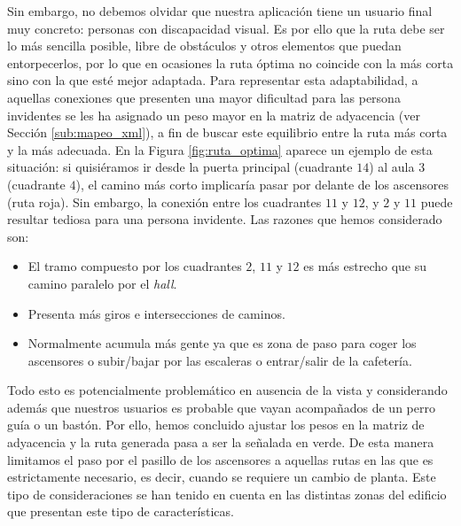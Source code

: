 Sin embargo, no debemos olvidar que nuestra aplicación tiene un usuario final muy concreto: personas con discapacidad visual. Es por ello que la ruta debe ser lo más sencilla posible, libre de obstáculos y otros elementos que puedan entorpecerlos, por lo que en ocasiones la ruta óptima no coincide con la más corta sino con la que esté mejor adaptada. Para representar esta adaptabilidad, a aquellas conexiones que presenten una mayor dificultad para las persona invidentes se les ha asignado un peso mayor en la matriz de adyacencia (ver Sección \ref{sub:mapeo_xml}), a fin de buscar este equilibrio entre la ruta más corta y la más adecuada. En la Figura \ref{fig:ruta_optima} aparece un ejemplo de esta situación: si quisiéramos ir desde la puerta principal (cuadrante $14$) al aula 3 (cuadrante $4$), el camino más corto implicaría pasar por delante de los ascensores (ruta roja). Sin embargo, la conexión entre los cuadrantes $11$ y $12$, y $2$ y $11$ puede resultar tediosa para una persona invidente. Las razones que hemos considerado son: 
\begin{itemize}
	\item El tramo compuesto por los cuadrantes $2$, $11$ y $12$ es más estrecho que su camino paralelo por el \textit{hall}.
	\item Presenta más giros e intersecciones de caminos.
	\item Normalmente acumula más gente ya que es zona de paso para coger los ascensores o subir/bajar por las escaleras o entrar/salir de la cafetería.
\end{itemize} 
 	Todo esto es potencialmente problemático en ausencia de la vista y considerando además que nuestros usuarios es probable que vayan acompañados de un perro guía o un bastón. Por ello, hemos concluido ajustar los pesos en la matriz de adyacencia y la ruta generada pasa a ser la señalada en verde. De esta manera limitamos el paso por el pasillo de los ascensores a aquellas rutas en las que es estrictamente necesario, es decir, cuando se requiere un cambio de planta. Este tipo de consideraciones se han tenido en cuenta en las distintas zonas del edificio que presentan este tipo de características.


